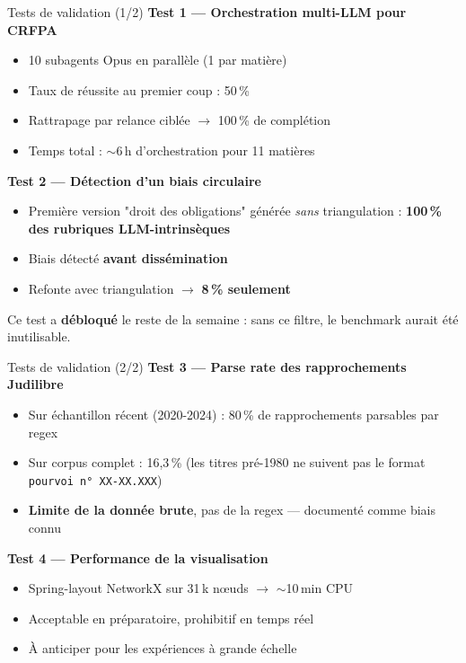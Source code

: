 \documentclass[aspectratio=169,10pt]{beamer}
\newcommand{\keybox}[1]{%
  \begin{center}
  \colorbox{accentsoft}{\parbox{0.92\linewidth}{\centering #1}}
  \end{center}}
\begin{document}
\begin{frame}{Tests de validation (1/2)}
  \textbf{Test 1 --- Orchestration multi-LLM pour CRFPA}
  \begin{itemize}\footnotesize
    \item 10 subagents Opus en parallèle (1 par matière)
    \item Taux de réussite au premier coup : 50\,\%
    \item Rattrapage par relance ciblée $\to$ 100\,\% de complétion
    \item Temps total : $\sim$6\,h d'orchestration pour 11 matières
  \end{itemize}

  \vspace{0.5em}
  \textbf{Test 2 --- Détection d'un biais circulaire}
  \begin{itemize}\footnotesize
    \item Première version "droit des obligations" générée \textit{sans} triangulation : \textcolor{warn}{\textbf{100\,\% des rubriques LLM-intrinsèques}}
    \item Biais détecté \textbf{avant dissémination}
    \item Refonte avec triangulation $\to$ \textcolor{ok}{\textbf{8\,\% seulement}}
  \end{itemize}

  \keybox{\small Ce test a \textbf{débloqué} le reste de la semaine : sans ce filtre, le benchmark aurait été inutilisable.}
\end{frame}

\begin{frame}{Tests de validation (2/2)}
  \textbf{Test 3 --- Parse rate des rapprochements Judilibre}
  \begin{itemize}\footnotesize
    \item Sur échantillon récent (2020-2024) : 80\,\% de rapprochements parsables par regex
    \item Sur corpus complet : 16{,}3\,\% (les titres pré-1980 ne suivent pas le format \texttt{pourvoi n° XX-XX.XXX})
    \item \textbf{Limite de la donnée brute}, pas de la regex --- documenté comme biais connu
  \end{itemize}

  \vspace{0.5em}
  \textbf{Test 4 --- Performance de la visualisation}
  \begin{itemize}\footnotesize
    \item Spring-layout NetworkX sur 31\,k n\oe uds $\to$ $\sim$10\,min CPU
    \item Acceptable en préparatoire, prohibitif en temps réel
    \item À anticiper pour les expériences à grande échelle
  \end{itemize}
\end{frame}
\end{document}

